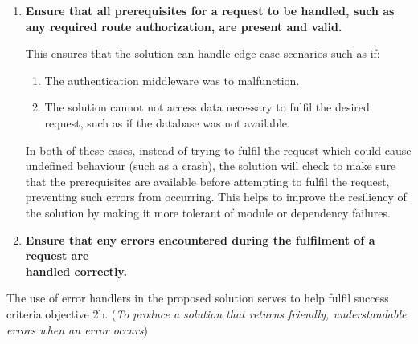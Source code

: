 \documentclass[../../main.tex]{subfiles}
\begin{document}
\begin{enumerate}
    \item \textbf{Ensure that all prerequisites for a request to be handled, such
              as any required route authorization, are present and valid.}

          This ensures that the solution can handle edge case scenarios such as if:

          \begin{enumerate}
              \item The authentication middleware was to malfunction.

              \item The solution cannot not access data necessary to fulfil the desired request, such as if the database was not available.
          \end{enumerate}

          \noindent In both of these cases, instead of trying to fulfil the request
          which could cause undefined
          behaviour (such as a crash), the solution will check
          to make sure that the prerequisites are available before attempting
          to fulfil the request, preventing such errors from occurring.
          This helps to improve the resiliency of the solution by making it
          more tolerant of module or dependency failures.


    \item \textbf{Ensure that eny errors encountered during the
              fulfilment of a request are\\ handled correctly.}

\end{enumerate}

\noindent The use of error handlers in the proposed solution serves to
help fulfil success criteria objective 2b. (\textit{To produce a solution
    that returns friendly, understandable errors when an error occurs})
\end{document}
